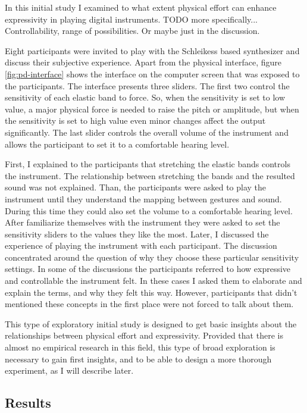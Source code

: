 \documentclass{sigchi}
\begin{document}
In this initial study I examined to what extent physical effort can enhance expressivity in playing digital instruments.
TODO more specifically... Controllability, range of possibilities. Or maybe just in the discussion.

Eight participants were invited to play with the Schleikess based synthesizer and discuss their subjective experience.
Apart from the physical interface, figure \ref{fig:pd-interface} shows the interface on the computer screen that was exposed to the participants.
The interface presents three sliders.
The first two control the sensitivity of each elastic band to force.
So, when the sensitivity is set to low value, a major physical force is needed to raise the pitch or amplitude, but when the sensitivity is set to high value even minor changes affect the output significantly.
The last slider controls the overall volume of the instrument and allows the participant to set it to a comfortable hearing level.

First, I explained to the participants that stretching the elastic bands controls the instrument.
The relationship between stretching the bands and the resulted sound was not explained.
Than, the participants were asked to play the instrument until they understand the mapping between gestures and sound.
During this time they could also set the volume to a comfortable hearing level.
After familiarize themselves with the instrument they were asked to set the sensitivity sliders to the values they like the most.
Later, I discussed the experience of playing the instrument with each participant.
The discussion concentrated around the question of why they choose these particular sensitivity settings.
In some of the discussions the participants referred to how expressive and controllable the instrument felt.
In these cases I asked them to elaborate and explain the terms, and why they felt this way.
However, participants that didn't mentioned these concepts in the first place were not forced to talk about them.

This type of exploratory initial study is designed to get basic insights about the relationships between physical effort and expressivity.
Provided that there is almost no empirical research in this field, this type of broad exploration is necessary to gain first insights, and to be able to design a more thorough experiment, as I will describe later.

\subsection{Results}
\end{document}
